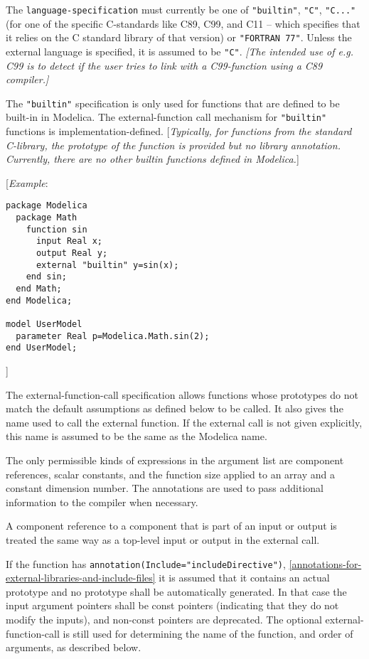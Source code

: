 The \lstinline!language-specification! must currently be one of \lstinline!"builtin"!,
\lstinline!"C"!,
\lstinline!"C..."! (for one of the specific C-standards like C89, C99, and C11
-- which specifies that it relies on the C standard library of that
version) or \lstinline!"FORTRAN 77"!. Unless the external language is specified, it
is assumed to be \lstinline!"C"!. \emph{{[}The intended use of e.g. C99 is to
detect if the user tries to link with a C99-function using a C89
compiler.{]} }

The \lstinline!"builtin"! specification is only used for functions that are defined
to be built-in in Modelica. The external-function call mechanism for
\lstinline!"builtin"! functions is implementation-defined. {[}\emph{Typically, for
functions from the standard C-library, the prototype of the function is
provided but no library annotation. Currently, there are no other
builtin functions defined in Modelica.}{]}

{[}\emph{Example}:

\begin{lstlisting}[language=modelica]
package Modelica
  package Math
    function sin
      input Real x;
      output Real y;
      external "builtin" y=sin(x);
    end sin;
  end Math;
end Modelica;

model UserModel
  parameter Real p=Modelica.Math.sin(2);
end UserModel;
\end{lstlisting}
{]}

The external-function-call specification allows functions whose
prototypes do not match the default assumptions as defined below to be
called. It also gives the name used to call the external function. If
the external call is not given explicitly, this name is assumed to be
the same as the Modelica name.

The only permissible kinds of expressions in the argument list are
component references, scalar constants, and the function size applied to
an array and a constant dimension number. The annotations are used to
pass additional information to the compiler when necessary.

A component reference to a component that is part of an input or output
is treated the same way as a top-level input or output in the external
call.

If the function has \lstinline!annotation(Include="includeDirective")!, \autoref{annotations-for-external-libraries-and-include-files}
it is assumed that it contains an actual prototype and no prototype shall be automatically generated.
In that case the input argument pointers shall be const pointers (indicating that they do not modify the inputs),
and non-const pointers are deprecated.
The optional external-function-call is still used for determining the name of the function, and order of arguments, as described below.

